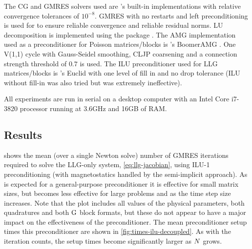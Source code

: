 The CG and GMRES solvers used are \oomph's built-in implementations with relative convergence tolerances of $10^{-8}$.
GMRES with no restarts and left preconditioning is used for to ensure reliable convergence and reliable residual norms.
LU decomposition is implemented using the \superlu package \cite{superlu}.
The AMG implementation used as a preconditioner for Poisson matrices/blocks is \hypre's BoomerAMG \cite{hypre}.
One V(1,1) cycle with Gauss-Seidel smoothing, CLJP coarsening and a connection strength threshold of $0.7$ is used.
The ILU preconditioner used for LLG matrices/blocks is \hypre's Euclid with one level of fill in and no drop tolerance (ILU without fill-in was also tried but was extremely ineffective).


All experiments are run in serial on a desktop computer with an Intel Core i7-3820 processor running at 3.6GHz and 16GB of RAM.


\subsection{Results}

 shows the mean (over a single Newton solve) number of GMRES iterations required to solve the LLG-only system, \cref{eq:llg-jacobian}, using ILU-1 preconditioning (\ie with magnetostatics handled by the semi-implicit approach).
As is expected for a general-purpose preconditioner it is effective for small matrix sizes, but becomes less effective for large problems and as the time step size increases.
Note that the plot includes all values of the physical parameters, both quadratures and both $\mathrm{G}$ block formats, but these do not appear to have a major impact on the effectiveness of the preconditioner.
The mean preconditioner setup times this preconditioner are shown in \cref{fig:times-ilu-decoupled}.
As with the iteration counts, the setup times become significantly larger as $N$ grows.

